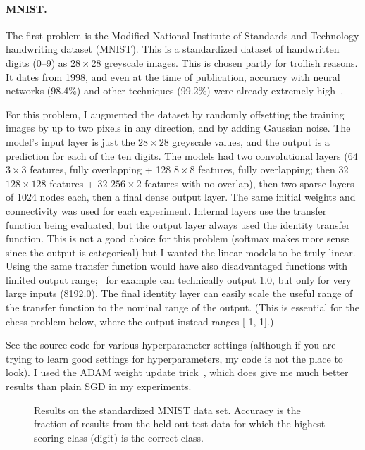\documentclass[twocolumn]{article}
\newcommand\xbyx[2]{\ensuremath{#1 {\times} #2}}
\begin{document}
\paragraph{MNIST.}
The first problem is the Modified National Institute of Standards and
Technology handwriting dataset (MNIST). This is a standardized dataset
of handwritten digits (0–9) as \xbyx{28}{28} greyscale images. This is chosen
partly for trollish reasons. It dates from 1998, and even at the time
of publication, accuracy with neural networks (98.4\%) and other
techniques (99.2\%) were already extremely high~\cite{lecun1998gradient}.

For this problem, I augmented the dataset by randomly offsetting the
training images by up to two pixels in any direction, and by adding
Gaussian noise. The model's input layer is just the $28 \times 28$
greyscale values, and the output is a prediction for each of the ten
digits. The models had two convolutional layers (64 \xbyx{3}{3} features,
fully overlapping + 128 \xbyx{8}{8} features, fully overlapping; then
32 \xbyx{128}{128} features + 32 \xbyx{256}{2} features with no
overlap), then two sparse layers of 1024 nodes each, then a final
dense output layer. The same initial weights and connectivity was used
for each experiment. Internal layers use the transfer function being
evaluated, but the output layer always used the identity transfer
function. This is not a good choice for this problem (softmax makes
more sense since the output is categorical) but I wanted the linear
models to be truly linear. Using the same transfer function would have
also disadvantaged functions with limited output range; \downshifttwo\
for example can technically output 1.0, but only for very large inputs
(8192.0). The final identity layer can easily scale the useful range
of the transfer function to the nominal range of the output. (This is
essential for the chess problem below, where the output instead ranges
[-1, 1].)

See the source code for various hyperparameter settings (although if
you are trying to learn good settings for hyperparameters, my code is
not the place to look). I used the ADAM weight update
trick~\cite{kingma2014adam}, which does give me much better results
than plain SGD in my experiments.

\begin{figure}[htp]
  
  \caption{
    Results on the standardized MNIST data set. Accuracy is the
    fraction of results from the held-out test data for which the
    highest-scoring class (digit) is the correct class.
  } \label{fig:mnistresults}
\end{figure}
\end{document}
